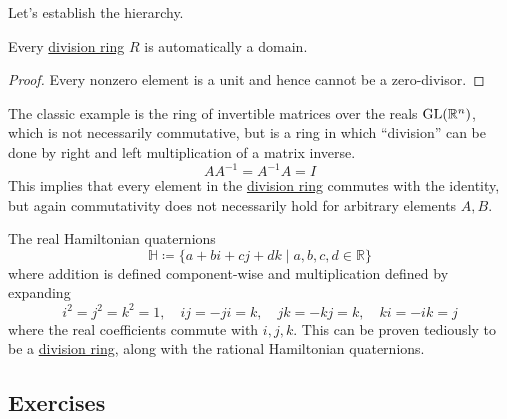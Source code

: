   Let's establish the hierarchy. 

  \begin{lemma}
    \label{thm:division-rings-are-domains}
    Every \hyperref[def:division-ring]{division ring} $R$ is automatically a domain. 
  \end{lemma}
  \begin{proof}
    Every nonzero element is a unit and hence cannot be a zero-divisor. 
  \end{proof}

  \begin{example}
    \label{ex:invertible-matrices}
    The classic example is the ring of invertible matrices over the reals $\operatorname{GL}(\mathbb{R}^n)$, which is not necessarily commutative, but is a ring in which ``division'' can be done by right and left multiplication of a matrix inverse. 
    \begin{equation}
      A A^{-1} = A^{-1} A = I
    \end{equation}
    This implies that every element in the \hyperref[def:division-ring]{division ring} commutes with the identity, but again commutativity does not necessarily hold for arbitrary elements $A, B$. 
  \end{example} 

  \begin{example}
    \label{ex:hamiltonian-quaternions}
    The real Hamiltonian quaternions 
    \begin{equation}
      \mathbb{H} \coloneqq \{a + bi + cj + dk \mid a, b, c, d \in \mathbb{R} \} 
    \end{equation}
    where addition is defined component-wise and multiplication defined by expanding 
    \begin{equation}
      i^2 = j^2 = k^2 = 1, \quad ij = -ji = k, \quad jk = -kj = k, \quad ki = -ik = j 
    \end{equation}
    where the real coefficients commute with $i, j, k$. This can be proven tediously to be a \hyperref[def:division-ring]{division ring}, along with the rational Hamiltonian quaternions. 
  \end{example}

\subsection{Exercises}

